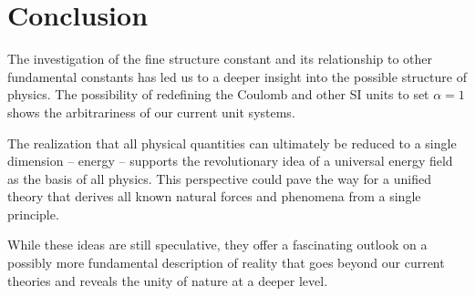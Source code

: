 \documentclass{article}
\begin{document}
\section{Conclusion}

The investigation of the fine structure constant and its relationship to other fundamental constants has led us to a deeper insight into the possible structure of physics. The possibility of redefining the Coulomb and other SI units to set $\alpha = 1$ shows the arbitrariness of our current unit systems.

The realization that all physical quantities can ultimately be reduced to a single dimension – energy – supports the revolutionary idea of a universal energy field as the basis of all physics. This perspective could pave the way for a unified theory that derives all known natural forces and phenomena from a single principle.

While these ideas are still speculative, they offer a fascinating outlook on a possibly more fundamental description of reality that goes beyond our current theories and reveals the unity of nature at a deeper level.
\end{document}
